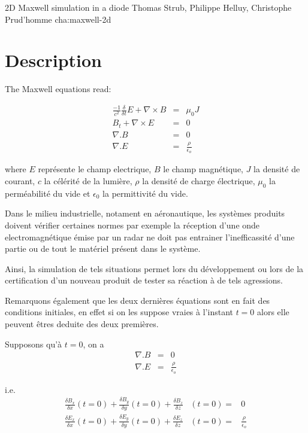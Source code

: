             {2D Maxwell simulation in a diode}
            {Thomas Strub, Philippe Helluy, Christophe Prud'homme}
            {cha:maxwell-2d}

\section{Description}
\label{sec:description}

The Maxwell equations read:


\begin{eqnarray*}
\frac{-1}{c^{2}}\frac{\delta}{\delta t}E+\nabla\times B & = & \mu_{0}J\\
B_{t}+\nabla\times E & = & 0\\
\nabla.B & = & 0\\
\nabla.E & = & \frac{\rho}{\epsilon_{o}}
\end{eqnarray*}


where $E$ représente le champ electrique, $B$ le champ magnétique,
$J$ la densité de courant, $c$ la célérité de la lumière, $\rho$
la densité de charge électrique, $\mu_{0}$ la perméabilité du vide
et $\epsilon_{0}$ la permittivité du vide.

Dans le milieu industrielle, notament en aéronautique, les systèmes
produits doivent vérifier certaines normes par exemple la réception
d'une onde electromagnétique émise par un radar ne doit pas entrainer
l'inefficassité d'une partie ou de tout le matériel présent dans le
système.

Ainsi, la simulation de tels situations permet lors du développement
ou lors de la certification d'un nouveau produit de tester sa réaction
à de tels agressions.

Remarquons également que les deux dernières équations sont en fait
des conditions initiales, en effet si on les suppose vraies à l'instant
$t=0$ alors elle peuvent êtres deduite des deux premières.

Supposons qu'à $t=0$, on a
\begin{eqnarray*}
\nabla.B & = & 0\\
\nabla.E & = & \frac{\rho}{\epsilon_{o}}
\end{eqnarray*}


i.e.\begin{eqnarray*}
\frac{\delta B_{x}}{\delta x}(t=0)+\frac{\delta B_{y}}{\delta y}(t=0)+\frac{\delta B_{z}}{\delta z} & (t=0)= & 0\\
\frac{\delta E_{x}}{\delta x}(t=0)+\frac{\delta E_{y}}{\delta y}(t=0)+\frac{\delta E_{z}}{\delta z} & (t=0)= & \frac{\rho}{\epsilon_{o}}\end{eqnarray*}


